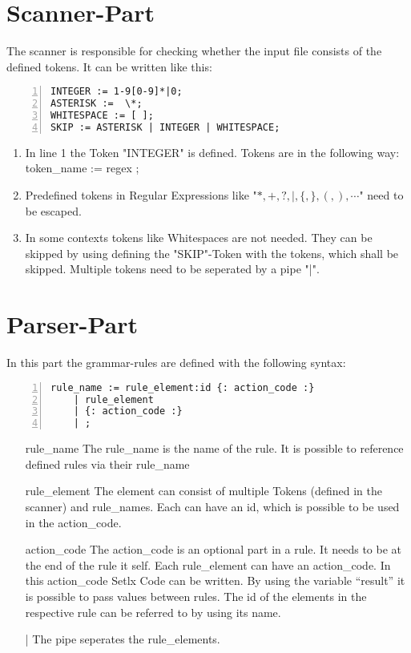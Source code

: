 \section{Scanner-Part}
The scanner is responsible for checking whether the input file consists of the defined tokens. It can be written like this:
\begin{lstlisting}[frame=single,numbers=left,basicstyle=\footnotesize]
INTEGER := 1-9[0-9]*|0;
ASTERISK :=  \*;
WHITESPACE := [ ];
SKIP := ASTERISK | INTEGER | WHITESPACE;
\end{lstlisting}
\begin{enumerate}
	\item In line 1 the Token "INTEGER" is defined. Tokens are in the following way:\\
					token\_name := regex ;
	\item Predefined tokens in Regular Expressions like "$*,+,?,|,\{,\},(,),\cdots$" need to be escaped.
	\item In some contexts tokens like Whitespaces are not needed. They can be skipped by using defining the "SKIP"-Token with the tokens, which shall be skipped. Multiple tokens need to be seperated by a pipe "|".
\end{enumerate}

\section{Parser-Part}
In this part the grammar-rules are defined with the following syntax:
\begin{lstlisting}[frame=single,numbers=left,basicstyle=\footnotesize]
rule_name := rule_element:id {: action_code :} 
	| rule_element
	| {: action_code :} 
	| ;
\end{lstlisting}
\begin{itemize}
	\item[rule\_name] The rule\_name is the name of the rule. It is possible to reference defined rules via their rule\_name
	\item[rule\_element] The element can consist of multiple Tokens (defined in the scanner) and rule\_names. Each can have an id, which is possible to be used in the action\_code.
	\item[action\_code] The action\_code is an optional part in a rule. It needs to be at the end of the rule it self. Each rule\_element can have an action\_code. In this action\_code Setlx Code can be written. By using the variable "`result"' it is possible to pass values between rules. The id of the elements in the respective rule can be referred to by using its name.
	\item[|] The pipe seperates the rule\_elements.
\end{itemize}
\newpage
